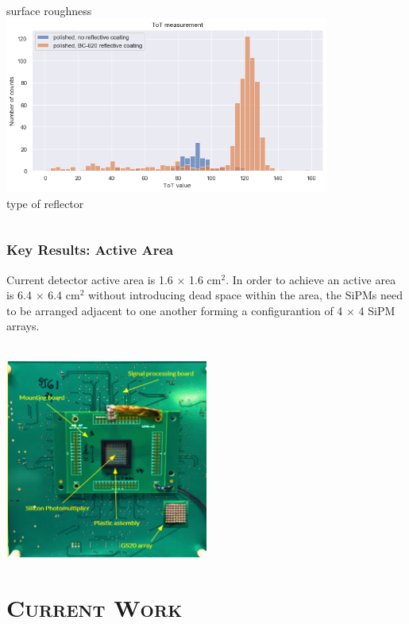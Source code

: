\documentclass[xcolor=x11names, compress, handout]{beamer}
\renewcommand{\(}{\begin{columns}}
\renewcommand{\)}{\end{columns}}
\newcommand{\<}[1]{\begin{column}{#1}}
\renewcommand{\>}{\end{column}}
\begin{document}
\begin{frame}
\begin{columns}
\begin{column}{0.5\textwidth}
  \scriptsize surface roughness
  \includegraphics[width=0.8\textwidth]{images/roughness2.png} \\
  type of reflector
  \end{column}
  \end{columns}
\end{frame}

\begin{frame}
  \frametitle{Key Results: Active Area}
  \scriptsize Current detector active area is 1.6 $\times$ 1.6 cm$^2$. In order to achieve an active area is 6.4 $\times$ 6.4 cm$^2$ without introducing dead space within the area, the SiPMs need to be arranged adjacent to one another forming a configurantion of 4 $\times$ 4 SiPM arrays. \\
  \

  \centering
  \includegraphics[width=0.5\textwidth]{images/signal_processing_board.PNG}
\end{frame}

\section{\scshape Current Work}
\end{document}
